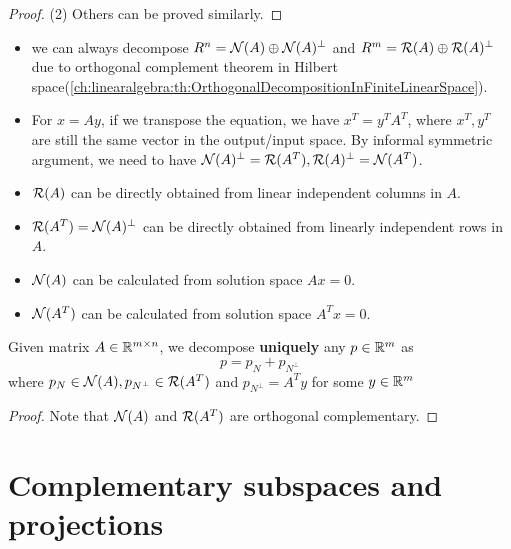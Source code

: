 \begin{refsection}
\begin{proof}
(2)	Others can be proved similarly.
\end{proof}


\begin{remark}[interpretation]\hfill
	\begin{itemize}
		\item we can always decompose $R^n = \mathcal{N}(A) \oplus \mathcal{N}(A)^{\perp}$ and $R^m = \mathcal{R}(A) \oplus \mathcal{R}(A)^{\perp}$ due to orthogonal complement theorem in Hilbert space(\autoref{ch:linearalgebra:th:OrthogonalDecompositionInFiniteLinearSpace}). 
		\item For $x=Ay$, if we transpose the equation, we have $x^T = y^TA^T$, where $x^T,y^T$ are still the same vector in the output/input space. By informal symmetric argument, we need to have $\mathcal{N}(A)^{\perp} = \mathcal{R}(A^T),\mathcal{R}(A)^{\perp} = \mathcal{N}(A^T)$.
	\end{itemize}
\end{remark}


\begin{remark}\hfill
	\begin{itemize}
		\item $\mathcal{R}(A)$ can be directly obtained from linear independent columns in $A$.
		\item $\mathcal{R}(A^T) = \mathcal{N}(A)^\perp$ can be directly obtained from linearly independent rows in $A$.
		\item $\mathcal{N}(A)$ can be calculated from solution space $Ax = 0$.
		\item $\mathcal{N}(A^T)$ can be calculated from solution space $A^Tx = 0$.
	\end{itemize}
\end{remark}


\begin{corollary}\label{ch:linearalgebra:th:RangeNullVectorDecomposition}
	Given matrix $A\in \mathbb{R}^{m\times n}$, we decompose \textbf{uniquely} any $p \in \mathbb{R}^m $ as
	$$p = p_N + p_{N^\perp}$$
	where $p_N\in \mathcal{N}(A), p_{N^\perp} \in \mathcal{R}(A^T)$ and $p_{N^\perp} = A^T y$ for some $y\in \mathbb{R}^m$
\end{corollary}
\begin{proof}
Note that $\mathcal{N}(A)$ and $\mathcal{R}(A^T)$ are orthogonal complementary.
\end{proof}


\section{Complementary subspaces and projections}

\end{refsection}
